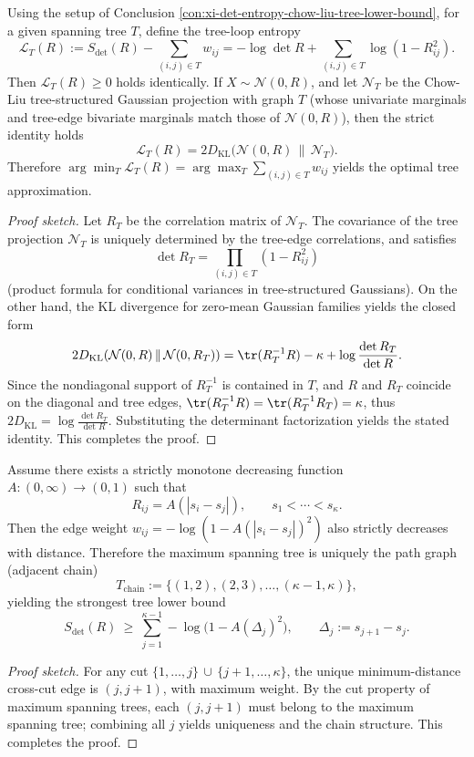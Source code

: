 \begin{conclusion}\label{con:xi-det-entropy-loop-entropy-kl-gap}
Using the setup of Conclusion \ref{con:xi-det-entropy-chow-liu-tree-lower-bound}, for a given spanning tree \(T\), define the tree-loop entropy
\[
\mathcal L_T(R):=S_{\det}(R)-\sum_{(i,j)\in T}w_{ij}
=-\log\det R+\sum_{(i,j)\in T}\log(1-R_{ij}^2).
\]
Then \(\mathcal L_T(R)\ge 0\) holds identically.
If \(X\sim\mathcal N(0,R)\), and let \(\mathcal N_T\) be the Chow-Liu tree-structured Gaussian projection with graph \(T\) (whose univariate marginals and tree-edge bivariate marginals match those of \(\mathcal N(0,R)\)), then the strict identity holds
\[
\mathcal L_T(R)=2D_{\mathrm{KL}}\!\bigl(\mathcal N(0,R)\,\|\,\mathcal N_T\bigr).
\]
Therefore
\(
\arg\min_T\mathcal L_T(R)=\arg\max_T\sum_{(i,j)\in T}w_{ij}
\)
yields the optimal tree approximation.
\end{conclusion}
\begin{proof}[Proof sketch]
Let \(R_T\) be the correlation matrix of \(\mathcal N_T\).
The covariance of the tree projection \(\mathcal N_T\) is uniquely determined by the tree-edge correlations, and satisfies
\[
\det R_T=\prod_{(i,j)\in T}(1-R_{ij}^2)
\]
(product formula for conditional variances in tree-structured Gaussians).
On the other hand, the KL divergence for zero-mean Gaussian families yields the closed form
\[
2D_{\mathrm{KL}}(\mathcal N(0,R)\,\|\,\mathcal N(0,R_T))
=\tr(R_T^{-1}R)-\kappa+\log\frac{\det R_T}{\det R}.
\]
Since the nondiagonal support of \(R_T^{-1}\) is contained in \(T\), and \(R\) and \(R_T\) coincide on the diagonal and tree edges,
\(
\tr(R_T^{-1}R)=\tr(R_T^{-1}R_T)=\kappa
\),
thus
\(
2D_{\mathrm{KL}}=\log\frac{\det R_T}{\det R}
\).
Substituting the determinant factorization yields the stated identity. This completes the proof.
\end{proof}

\begin{conclusion}\label{con:xi-det-entropy-monotone-kernel-chain-mst}
Assume there exists a strictly monotone decreasing function \(A:(0,\infty)\to(0,1)\) such that
\[
R_{ij}=A(|s_i-s_j|),
\qquad
s_1<\cdots<s_\kappa.
\]
Then the edge weight \(w_{ij}=-\log(1-A(|s_i-s_j|)^2)\) also strictly decreases with distance.
Therefore the maximum spanning tree is uniquely the path graph (adjacent chain)
\[
T_{\mathrm{chain}}:=\{(1,2),(2,3),\dots,(\kappa-1,\kappa)\},
\]
yielding the strongest tree lower bound
\[
S_{\det}(R)\ \ge\ \sum_{j=1}^{\kappa-1}-\log\!\bigl(1-A(\Delta_j)^2\bigr),
\qquad
\Delta_j:=s_{j+1}-s_j.
\]
\end{conclusion}
\begin{proof}[Proof sketch]
For any cut \(\{1,\dots,j\}\,\cup\,\{j+1,\dots,\kappa\}\), the unique minimum-distance cross-cut edge is \((j,j+1)\), with maximum weight.
By the cut property of maximum spanning trees, each \((j,j+1)\) must belong to the maximum spanning tree; combining all \(j\) yields uniqueness and the chain structure. This completes the proof.
\end{proof}

